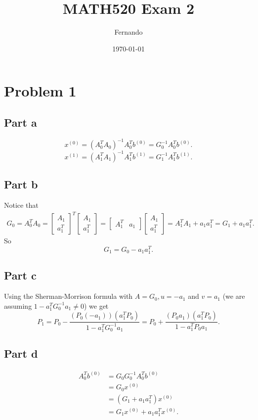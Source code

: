 \documentclass{article}
\begin{document}
\title{MATH520 Exam 2}
\author{Fernando}
\date{\today}
\maketitle

\section*{Problem 1}
\subsection*{Part a}
\[
	x^{(0)}=\left(A_0^TA_0\right)^{-1}A_0^Tb^{(0)}=G_0^{-1}A_0^Tb^{(0)}.
\]
\[
	x^{(1)}=\left(A_1^TA_1\right)^{-1}A_1^Tb^{(1)}=G_1^{-1}A_1^Tb^{(1)}.
\]
\subsection*{Part b}
Notice that
\begin{align*}
G_0=A_0^TA_0=\begin{bmatrix}
A_1\\
a_1^T
\end{bmatrix}^T
\begin{bmatrix}
A_1\\
a_1^T
\end{bmatrix}
=
\begin{bmatrix}
A_1^T & a_1
\end{bmatrix}
\begin{bmatrix}
A_1\\
a_1^T
\end{bmatrix}
=
A_1^TA_1+a_1a_1^T
=G_1+a_1a_1^T.
\end{align*}
So
\[
	G_1=G_0-a_1a_1^T.
\]
\subsection*{Part c}
Using the Sherman-Morrison formula with $A=G_0,u=-a_1$ and $v=a_1$ (we are
assuming $1-a_1^TG_0^{-1}a_1\neq 0$) we get
\[
	P_1=P_0-\frac{(P_0(-a_1))(a_1^TP_0)}{1-a_1^TG_0^{-1}a_1}=P_0+\frac{(P_0a_1)(a_1^TP_0)}{1-a_1^TP_0a_1}.
\]
\subsection*{Part d}
\begin{align*}
	A_0^Tb^{(0)}&=G_0G_0^{-1}A_0^Tb^{(0)}\\
	&=G_0x^{(0)}\\
	&=(G_1+a_1a_1^T)x^{(0)}\\
	&=G_1x^{(0)}+a_1a_1^Tx^{(0)}.
\end{align*}
\end{document}
